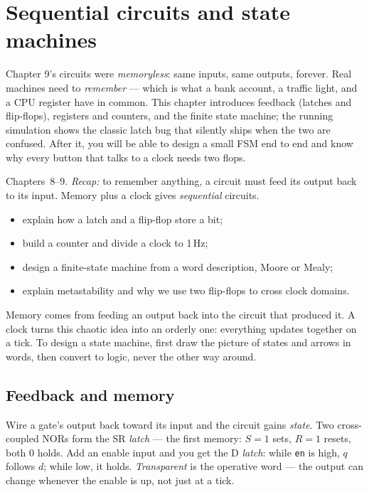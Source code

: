 \chapter{Sequential circuits and state machines}
\label{ch:seq}

Chapter 9's circuits were \emph{memoryless}: same inputs, same outputs,
forever. Real machines need to \emph{remember} — which is what a bank
account, a traffic light, and a CPU register have in common. This
chapter introduces feedback (latches and flip-flops), registers and
counters, and the finite state machine; the running simulation shows
the classic latch bug that silently ships when the two are confused.
After it, you will be able to design a small FSM end to end and know why
every button that talks to a clock needs two flops.

\begin{rulebox}
Chapters~8--9. \emph{Recap:} to remember anything, a circuit must feed its output back to its input. Memory plus a clock gives \emph{sequential} circuits.
\end{rulebox}
\begin{wins}
\begin{itemize}
\item explain how a latch and a flip-flop store a bit;
\item build a counter and divide a clock to 1\,Hz;
\item design a finite-state machine from a word description, Moore or Mealy;
\item explain metastability and why we use two flip-flops to cross clock domains.
\end{itemize}
\end{wins}
\begin{principle}
Memory comes from feeding an output back into the circuit that produced it. A clock turns this chaotic idea into an orderly one: everything updates together on a tick. To design a state machine, first draw the picture of states and arrows in words, then convert to logic, never the other way around.
\end{principle}

\section{Feedback and memory}
\label{sec:feedback}

Wire a gate's output back toward its input and the circuit gains
\emph{state}. Two cross-coupled NORs form the SR
\emph{latch} — the first memory: $S=1$ sets, $R=1$
resets, both 0 holds. Add an enable input and you get the D
\emph{latch}: while \texttt{en} is high, $q$ follows
$d$; while low, it holds. \emph{Transparent} is the operative word —
the output can change whenever the enable is up, not just at a tick.

